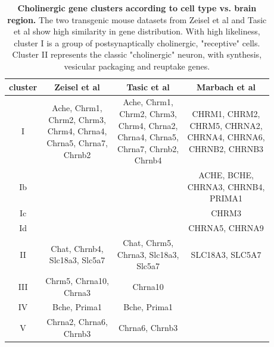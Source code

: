 \begin{table}
\sffamily
\small
\begin{tabular}{c | c | c | c}
cluster & Zeisel et al & Tasic et al & Marbach et al \\
\hline
\hline
I & \makecell{Ache, Chrm1, \\Chrm2, Chrm3, \\Chrm4, Chrna4, \\Chrna5, Chrna7, \\Chrnb2} & \makecell{Ache, Chrm1, \\Chrm2, Chrm3, \\Chrm4, Chrna2, \\Chrna4, Chrna5, \\Chrna7, Chrnb2, \\Chrnb4} & \makecell{CHRM1, CHRM2, \\CHRM5, CHRNA2, \\CHRNA4, CHRNA6, \\CHRNB2, CHRNB3} \\ \hline
Ib&  &  & \makecell{ACHE, BCHE, \\CHRNA3, CHRNB4, \\PRIMA1} \\ \hline
Ic& &  & CHRM3 \\ \hline
Id&  &  & CHRNA5, CHRNA9 \\ \hline
II& \makecell{Chat, Chrnb4, \\Slc18a3, Slc5a7} & \makecell{Chat, Chrm5, \\Chrna3, Slc18a3, \\Slc5a7} & SLC18A3, SLC5A7 \\ \hline
III& \makecell{Chrm5, Chrna10, \\Chrna3} & Chrna10 &  \\ \hline
IV&Bche, Prima1 & Bche, Prima1 &  \\ \hline
V& \makecell{Chrna2, Chrna6, \\Chrnb3} & Chrna6, Chrnb3 &  \\
\end{tabular}
\caption{\textbf{Cholinergic gene clusters according to cell type vs. brain region.} The two transgenic mouse datasets from Zeisel et al and Tasic et al show high similarity in gene distribution. With high likeliness, cluster I is a group of postsynaptically cholinergic, "receptive" cells. Cluster II represents the classic "cholinergic" neuron, with synthesis, vesicular packaging and reuptake genes.}
\label{tab:chol-clusters}
\end{table}

